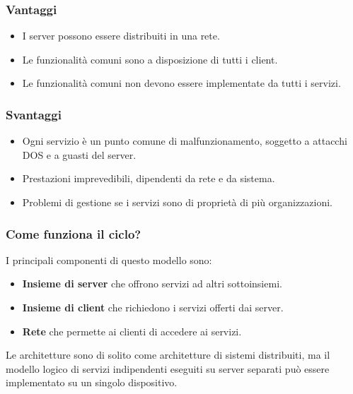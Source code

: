 \documentclass{report}
\begin{document}
\begin{multicols}{2}

    \subsubsection*{Vantaggi}
    \begin{itemize}
        \item I server possono essere distribuiti in una rete.
        \item Le funzionalità comuni sono a disposizione di tutti i client.
        \item Le funzionalità comuni non devono essere implementate da tutti i servizi.
    \end{itemize}
    
    \columnbreak
    
    \subsubsection*{Svantaggi}
    \begin{itemize}
        \item Ogni servizio è un punto comune di malfunzionamento, soggetto a attacchi DOS e a guasti del server.
        \item Prestazioni imprevedibili, dipendenti da rete e da sistema.
        \item Problemi di gestione se i servizi sono di proprietà di più organizzazioni.
    \end{itemize}
    
\end{multicols}

\newpage
\subsubsection*{Come funziona il ciclo?}
I principali componenti di questo modello sono:
\begin{itemize}
    \item \textbf{Insieme di server} che offrono servizi ad altri sottoinsiemi.
    \item \textbf{Insieme di client} che richiedono i servizi offerti dai server.
    \item \textbf{Rete} che permette ai clienti di accedere ai servizi. 
\end{itemize}

\noindent
Le architetture sono di solito come architetture di sistemi distribuiti, ma il modello logico di servizi indipendenti eseguiti su server separati può essere implementato su un singolo dispositivo.
\end{document}
